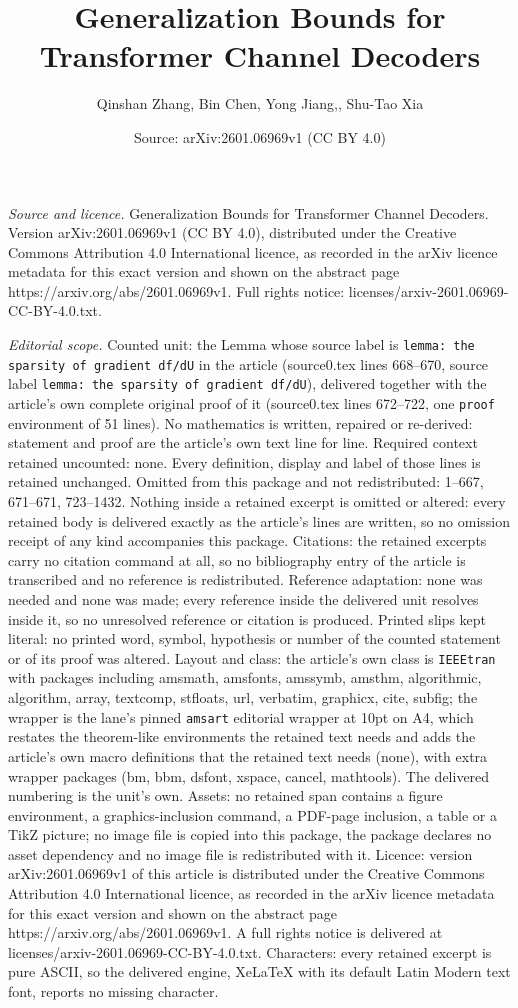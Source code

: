 \documentclass[10pt,a4paper]{amsart}
\title[Generalization Bounds for Transformer Channel Decoders]{Generalization Bounds for Transformer Channel Decoders}
\author{Qinshan Zhang, Bin Chen, Yong Jiang,, Shu-Tao Xia}
\date{Source: arXiv:2601.06969v1 (CC BY 4.0)}
\begin{document}
\maketitle

\noindent\emph{Source and licence.} Generalization Bounds for Transformer Channel Decoders. Version arXiv:2601.06969v1 (CC BY 4.0), distributed under the Creative Commons Attribution 4.0 International licence, as recorded in the arXiv licence metadata for this exact version and shown on the abstract page https://arxiv.org/abs/2601.06969v1. Full rights notice: licenses/arxiv-2601.06969-CC-BY-4.0.txt.\par\smallskip

\noindent\textit{Editorial scope.} Counted unit: the Lemma whose source label is \texttt{lemma: the sparsity of gradient df/dU} in the article (source0.tex lines 668--670, source label \texttt{lemma: the sparsity of gradient df/dU}), delivered together with the article's own complete original proof of it (source0.tex lines 672--722, one \texttt{proof} environment of 51 lines). No mathematics is written, repaired or re-derived: statement and proof are the article's own text line for line. Required context retained uncounted: none. Every definition, display and label of those lines is retained unchanged. Omitted from this package and not redistributed: 1--667, 671--671, 723--1432. Nothing inside a retained excerpt is omitted or altered: every retained body is delivered exactly as the article's lines are written, so no omission receipt of any kind accompanies this package. Citations: the retained excerpts carry no citation command at all, so no bibliography entry of the article is transcribed and no reference is redistributed. Reference adaptation: none was needed and none was made; every reference inside the delivered unit resolves inside it, so no unresolved reference or citation is produced. Printed slips kept literal: no printed word, symbol, hypothesis or number of the counted statement or of its proof was altered. Layout and class: the article's own class is \texttt{IEEEtran} with packages including amsmath, amsfonts, amssymb, amsthm, algorithmic, algorithm, array, textcomp, stfloats, url, verbatim, graphicx, cite, subfig; the wrapper is the lane's pinned \texttt{amsart} editorial wrapper at 10pt on A4, which restates the theorem-like environments the retained text needs and adds the article's own macro definitions that the retained text needs (none), with extra wrapper packages (bm, bbm, dsfont, xspace, cancel, mathtools). The delivered numbering is the unit's own. Assets: no retained span contains a figure environment, a graphics-inclusion command, a PDF-page inclusion, a table or a TikZ picture; no image file is copied into this package, the package declares no asset dependency and no image file is redistributed with it. Licence: version arXiv:2601.06969v1 of this article is distributed under the Creative Commons Attribution 4.0 International licence, as recorded in the arXiv licence metadata for this exact version and shown on the abstract page https://arxiv.org/abs/2601.06969v1. A full rights notice is delivered at licenses/arxiv-2601.06969-CC-BY-4.0.txt. Characters: every retained excerpt is pure ASCII, so the delivered engine, XeLaTeX with its default Latin Modern text font, reports no missing character.
\end{document}

